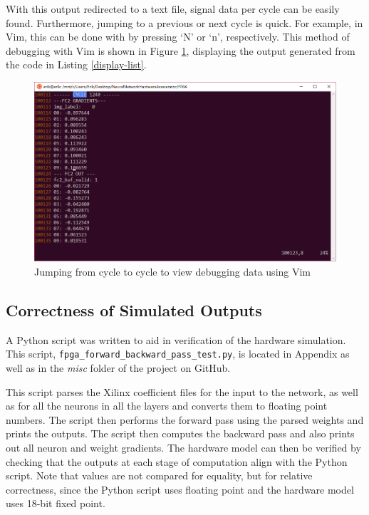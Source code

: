With this output redirected to a text file, signal data per cycle can be easily found. Furthermore, jumping to a previous or next cycle is quick. For example, in Vim, this can be done with by pressing `N' or `n', respectively. This method of debugging with Vim is shown in Figure \ref{vim-out}, displaying the output generated from the code in Listing \ref{display-list}.
\begin{figure}
	\centering 
	\includegraphics[width=\textwidth]{figures/vim_output}
	\caption{Jumping from cycle to cycle to view debugging data using Vim}\label{vim-out}
\end{figure}

\subsection{Correctness of Simulated Outputs}
A Python script was written to aid in verification of the hardware simulation. This script, \texttt{fpga\_forward\_backward\_pass\_test.py}, is located in Appendix  as well as in the \textit{misc} folder of the project on GitHub.

This script parses the Xilinx coefficient files for the input to the network, as well as for all the neurons in all the layers and converts them to floating point numbers. The script then performs the forward pass using the parsed weights and prints the outputs. The script then computes the backward pass and also prints out all neuron and weight gradients. The hardware model can then be verified by checking that the outputs at each stage of computation align with the Python script. Note that values are not compared for equality, but for relative correctness, since the Python script uses floating point and the hardware model uses 18-bit fixed point.

